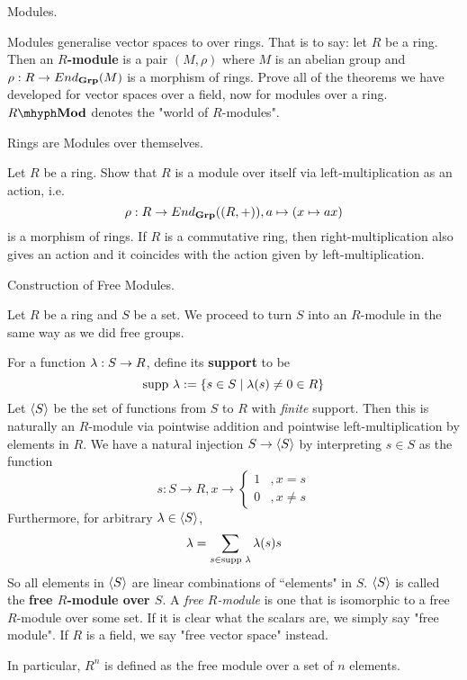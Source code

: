 \documentclass[../book.tex]{subfiles}
\begin{document}
\begin{ex} [Important] Modules. 

    Modules generalise vector spaces to over rings.
    That is to say: let $R$ be a ring. 
    Then an \textbf{$R$-module} is a pair $(M,\rho)$ where
    $M$ is an abelian group and $\rho : R \to End_{\mathbf{Grp}}(M)$ is a morphism of rings. 
    Prove all of the theorems we have developed for vector spaces over a field, 
    now for modules over a ring. 
    $\RMod$ denotes the "world of $R$-modules". 
\end{ex}

\begin{ex} [Important] Rings are Modules over themselves.

    Let $R$ be a ring. 
    Show that $R$ is a module over itself via left-multiplication as an action,
    i.e. \[
        \rho : R \to End_{\mathbf{Grp}}((R,+)), a \mapsto (x \mapsto ax)
    \]
    is a morphism of rings. 
    If $R$ is a commutative ring, 
    then right-multiplication also gives an action and
    it coincides with the action given by left-multiplication. 
\end{ex}

\begin{ex} [Skippable] Construction of Free Modules. 

    Let $R$ be a ring and $S$ be a set. 
    We proceed to turn $S$ into an $R$-module in the same way as we did free groups.
    
    For a function $\lambda : S \to R$, define its \textbf{support} to be \[
        \text{supp } \lambda := \{s \in S \mid \lambda(s) \neq 0 \in R\}
    \]
    Let $\langle S \rangle$ be the set of functions from $S$ to $R$ with \emph{finite} support.
    Then this is naturally an $R$-module via pointwise addition and
    pointwise left-multiplication by elements in $R$. 
    We have a natural injection $S \to \langle S \rangle$ by
    interpreting $s \in S$ as the function \[
        s : S \to R, x \to \begin{cases}
            1   &, x = s \\
            0   &, x \neq s
        \end{cases}
    \]
    Furthermore, for arbitrary $\lambda \in \langle S \rangle$, \[
        \lambda = \sum_{s \in \text{supp } \lambda} \lambda(s) s
    \]
    So all elements in $\langle S \rangle$ are linear combinations of ``elements" in $S$. 
    $\langle S\rangle$ is called the \textbf{free $R$-module over $S$}.
    A \emph{free $R$-module} is one that is isomorphic 
    to a free $R$-module over some set. 
    If it is clear what the scalars are, we simply say "free module".
    If $R$ is a field, we say "free vector space" instead. 
    
    In particular, $R^n$ is defined as the free module over a set of $n$ elements.
\end{ex}
\end{document}
